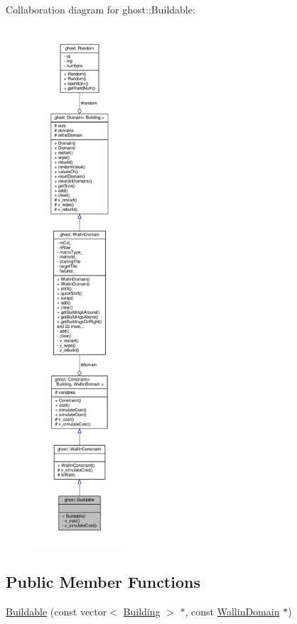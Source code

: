 Collaboration diagram for ghost\-:\-:Buildable\-:\nopagebreak
\begin{figure}[H]
\begin{center}
\leavevmode
\includegraphics[height=550pt]{classghost_1_1Buildable__coll__graph}
\end{center}
\end{figure}
\subsection*{Public Member Functions}
\begin{DoxyCompactItemize}
\item 
\hyperlink{classghost_1_1Buildable_afb25530b221922dd29a0a5bd7cdd68c6}{Buildable} (const vector$<$ \hyperlink{classghost_1_1Building}{Building} $>$ $\ast$, const \hyperlink{classghost_1_1WallinDomain}{Wallin\-Domain} $\ast$)
\end{DoxyCompactItemize}
